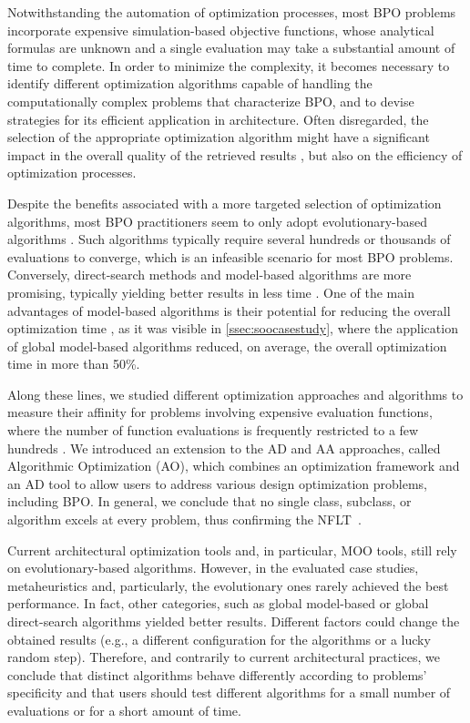 Notwithstanding the automation of optimization processes, most \ac{BPO} problems incorporate expensive simulation-based objective functions, whose analytical formulas are unknown and a single evaluation may take a substantial amount of time to complete. In order to minimize the complexity, it becomes necessary to identify different optimization algorithms capable of handling the computationally complex problems that characterize \ac{BPO}, and to devise strategies for its efficient application in architecture. Often disregarded, the selection of the appropriate optimization algorithm might have a significant impact in the overall quality of the retrieved results \cite{Wolpert1997NFLT}, but also on the efficiency of optimization processes. 

Despite the benefits associated with a more targeted selection of optimization algorithms, most \ac{BPO} practitioners seem to only adopt evolutionary-based algorithms \cite{Evins2013, Nguyen2014}. Such algorithms typically require several hundreds or thousands of evaluations to converge, which is an infeasible scenario for most \ac{BPO} problems. Conversely, direct-search methods and model-based algorithms are more promising, typically yielding better results in less time \cite{Waibel2018}. One of the main advantages of model-based algorithms is their potential for reducing the overall optimization time \cite{Wortmann2017GABESTCHOICE}, as it was visible in \cref{ssec:soocasestudy}, where the application of global model-based algorithms reduced, on average, the overall optimization time in more than 50\%. 

Along these lines, we studied different optimization approaches and algorithms to measure their affinity for problems involving expensive evaluation functions, where the number of function evaluations is frequently restricted to a few hundreds \cite{Caetano2018,Belem2018optimizeddesign,Belem2019MOO}. We introduced an extension to the \ac{AD} and \ac{AA} approaches, called Algorithmic Optimization (\ac{AO}), which combines an optimization framework and an \ac{AD} tool to allow users to address various design optimization problems, including \ac{BPO}. In general, we conclude that no single class, subclass, or algorithm excels at every problem, thus confirming the \ac{NFLT}~\cite{Wolpert1997NFLT}.  

Current architectural optimization tools and, in particular, \ac{MOO} tools, still rely on evolutionary-based algorithms. However, in the evaluated case studies, metaheuristics and, particularly, the evolutionary ones rarely achieved the best performance. In fact, other categories, such as global model-based or global direct-search algorithms yielded better results. Different factors could change the obtained results (e.g., a different configuration for the algorithms or a lucky random step). Therefore, and contrarily to current architectural practices, we conclude that distinct algorithms behave differently according to  problems' specificity and that users should test different algorithms for a small number of evaluations or for a short amount of time. 

